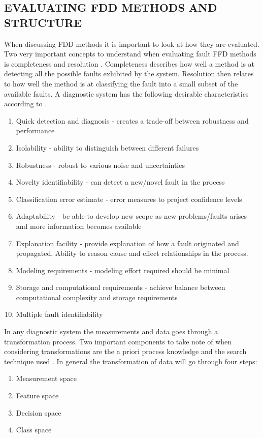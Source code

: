 \subsection{EVALUATING FDD METHODS AND STRUCTURE}

When discussing FDD methods it is important to look at how they are evaluated. Two very important concepts to understand when evaluating fault FFD methods is completeness and resolution \cite{venkatasubramanian2003review}. Completeness describes how well a method is at detecting all the possible faults exhibited by the system. Resolution then relates to how well the method is at classifying the fault into a small subset of the available faults. A diagnostic system has the following desirable characteristics according to \cite{venkatasubramanian2003review}.
\begin{enumerate}
	\item Quick detection and diagnosis - creates a trade-off between robustness and performance
	\item Isolability - ability to distinguish between different failures
	\item Robustness - robust to various noise and uncertainties
	\item Novelty identifiability - can detect a new/novel fault in the process
	\item Classification error estimate - error measures to project confidence levels
	\item Adaptability - be able to develop new scope as new problems/faults arises and more information becomes available
	\item Explanation facility - provide explanation of how a fault originated and propagated. Ability to reason cause and effect relationships in the process.
	\item Modeling requirements - modeling effort required should be minimal
	\item Storage and computational requirements - achieve balance between computational complexity and storage requirements
	\item Multiple fault identifiability	
\end{enumerate}\par

In any diagnostic system the measurements and data goes through a transformation process. Two important components to take note of when considering transformations are the a priori process knowledge and the search technique used \cite{venkatasubramanian2003review}. In general the transformation of data will go through four steps:
\begin{enumerate}
	\item Measurement space
	\item Feature space
	\item Decision space
	\item Class space	
\end{enumerate}\par

